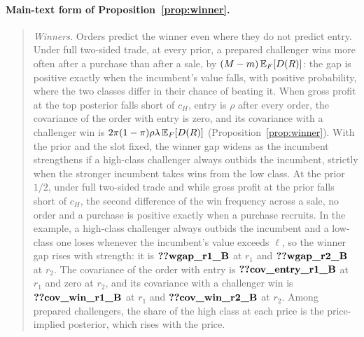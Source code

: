 \paragraph{Main-text form of Proposition~\ref{prop:winner}.}
\begin{quote}
\emph{Winners.} Orders predict the winner even where they do not predict entry. Under full two-sided trade, at
every prior, a prepared challenger wins more often after a purchase than after a sale, by \((M-m)\,\mathbb{E}_F[D(R)]\): the
gap is positive exactly when the incumbent's value falls, with positive probability, where the two classes differ in
their chance of beating it. When gross profit at the top posterior falls short of \(c_H\), entry is \(\rho\) after every
order, the covariance of the order with entry is zero, and its covariance with a challenger win is \(2\pi(1-\pi)\rho\lambda\,\mathbb{E}_F[D(R)]\) (Proposition~\ref{prop:winner}). With the
prior and the slot fixed, the winner gap widens as the incumbent strengthens if a high-class challenger always
outbids the incumbent, strictly when the stronger incumbent takes wins from the low class. At the prior \(1/2\), under
full two-sided trade and while gross profit at the prior falls short of \(c_H\), the second difference of the win
frequency across a sale, no order and a purchase is positive exactly when a purchase recruits. In the example, a
high-class challenger always outbids the incumbent and a low-class one loses whenever the incumbent's value exceeds
\(\ell\), so the winner gap rises with strength: it is \(\reg{wgap_r1_B}\) at \(r_1\) and \(\reg{wgap_r2_B}\) at
\(r_2\). The covariance of the order with entry is \(\reg{cov_entry_r1_B}\) at \(r_1\) and zero at \(r_2\), and its
covariance with a challenger win is \(\reg{cov_win_r1_B}\) at \(r_1\) and \(\reg{cov_win_r2_B}\) at \(r_2\). Among
prepared challengers, the share of the high class at each price is the price-implied posterior, which rises with the
price.
\end{quote}

